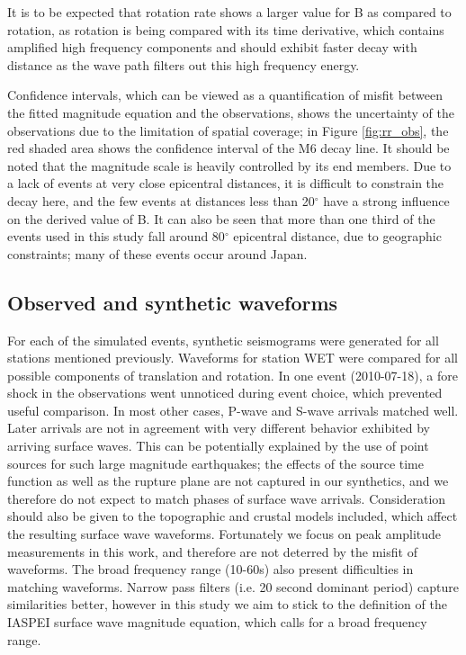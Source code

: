 \documentclass{gji}
\begin{document}
It is to be expected that rotation rate shows a larger value for B as compared to rotation, as rotation is being compared with its time derivative, which contains amplified high frequency components and should exhibit faster decay with distance as the wave path filters out this high frequency energy. 

Confidence intervals, which can be viewed as a quantification of misfit between the fitted magnitude equation and the observations, shows the uncertainty of the observations due to the limitation of spatial coverage; in Figure \ref{fig:rr_obs}, the red shaded area shows the confidence interval of the M6 decay line. %
It should be noted that the magnitude scale is heavily controlled by its end members. Due to a lack of events at very close epicentral distances, it is difficult to constrain the decay here, and the few events at distances less than 20$^\circ$ have a strong influence on the derived value of B. It can also be seen that more than one third of the events used in this study fall around 80$^\circ$ epicentral distance, due to geographic constraints; many of these events occur around Japan. 

\subsection{Observed and synthetic waveforms}
For each of the simulated events, synthetic seismograms were generated for all stations mentioned previously. Waveforms for station WET were compared for all possible components of translation and rotation. In one event (2010-07-18), a fore shock in the observations went unnoticed during event choice, which prevented useful comparison. In most other cases, P-wave and S-wave arrivals matched well. Later arrivals are not in agreement with very different behavior exhibited by arriving surface waves. This can be potentially explained by the use of point sources for such large magnitude earthquakes; the effects of the source time function as well as the rupture plane are not captured in our synthetics, and we therefore do not expect to match phases of surface wave arrivals. Consideration should also be given to the topographic and crustal models included, which affect the resulting surface wave waveforms. Fortunately we focus on peak amplitude measurements in this work, and therefore are not deterred by the misfit of waveforms. The broad frequency range (10-60s) also present difficulties in matching waveforms. Narrow pass filters (i.e. 20 second dominant period) capture similarities better, however in this study we aim to stick to the definition of the IASPEI surface wave magnitude equation, which calls for a broad frequency range.
\end{document}
